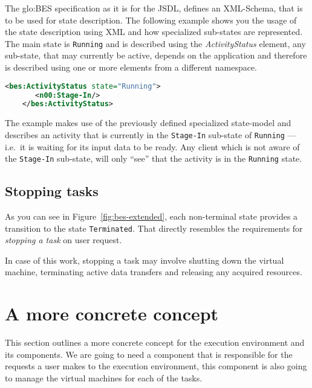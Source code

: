 The  \gls{glo:BES}  specification  as  it  is for  the  JSDL,  defines  an
XML-Schema,  that is  to  be  used for  state  description. The  following
example shows  you the usage  of the state  description using XML  and how
specialized sub-states are represented. The main state is \texttt{Running}
and is  described using the \emph{ActivityStatus}  element, any sub-state,
that may currently be active,  depends on the application and therefore is
described using one or more elements from a different namespace.

\begin{minipage}{0.75\textwidth}
  \begin{lstlisting}[language=XML]
    <bes:ActivityStatus state="Running">
       <n00:Stage-In/>
    </bes:ActivityStatus>
  \end{lstlisting}
\end{minipage}

The example  makes use of  the previously defined  specialized state-model
and  describes an  activity  that is  currently  in the  \texttt{Stage-In}
sub-state of \texttt{Running} --- i.e.~it is waiting for its input data to
be  ready.  Any  client  which  is  not  aware  of  the  \texttt{Stage-In}
sub-state, will only ``see'' that  the activity is in the \texttt{Running}
state.


\subsection{Stopping tasks}
\label{sec:stopping-task}

As  you can  see in  Figure~\ref{fig:bes-extended}, each  non-terminal state
provides  a transition  to  the state  \texttt{Terminated}. That  directly
resembles the requirements for \emph{stopping a task} on user request.

In  case of  this work,  stopping  a task  may involve  shutting down  the
virtual  machine,  terminating active  data  transfers  and releasing  any
acquired resources.

\section{A more concrete concept}

This  section   outlines  a  more  concrete  concept   for  the  execution
environment and its  components. We are going to need  a component that is
responsible for  the requests a  user makes to the  execution environment,
this component  is also going to  manage the virtual machines  for each of
the tasks.

